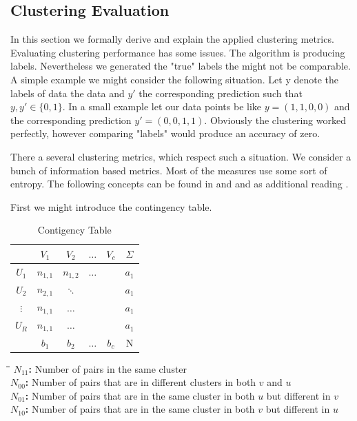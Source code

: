 \documentclass[12pt,a4paper,bibliography=totocnumbered,listof=totocnumbered]{scrartcl}
\begin{document}
\begin{appendix}
\subsection*{Clustering Evaluation}

In this section we formally derive and explain the applied clustering metrics. Evaluating clustering performance has some issues. The algorithm is producing labels. Nevertheless we generated the "true" labels the might not be comparable. A simple example we might consider the following situation. Let y denote the labels of data the data and $y'$ the corresponding prediction such that  $y,y' \in \{0,1\}$. In a small example let our data points be like $y=(1,1,0,0)$ and the corresponding prediction $y'=(0,0,1,1)$. Obviously the clustering worked perfectly, however comparing "labels" would produce an accuracy of zero. 

There a several clustering metrics, which respect such a situation. We consider a bunch of information based metrics. Most of the measures use some sort of entropy. The following concepts can be found in \cite{Rosenberg2007} and  \cite{Vinh2010} and as additional reading \cite{Hubert1985}. 

First we might introduce the contingency table. 

\setlength{\tabcolsep}{0.2cm}
\renewcommand{\arraystretch}{1}
\begin{table}[htb]
	\centering
	\begin{tabular}{c | c c c c| c}
		 & $V_1$ & $V_2$ & $\dots$ & $V_c$ & $\Sigma$ \\
		\hline
		$U_1$ & $n_{1,1}$ &$n_{1,2}$  &$\dots$ & & $a_1$ \\ 
		$U_2$ & $n_{2,1}$ & $\ddots$ & & & $a_1$ \\ 
		$\vdots$ & $n_{1,1}$ & $\dots$ & & & $a_1$ \\ 
		$U_R$ & $n_{1,1}$ & $\dots$ & & & $a_1$ \\ 
		\hline
		& $b_1$ & $b_2$ & $\dots$ & $b_c$ & N
	\end{tabular}
\caption{Contigency Table}
\end{table}


\begin{tabbing}
	\hspace*{1cm}\=\hspace*{1cm}\=\hspace*{3cm}\=\hspace*{2.7cm}\= \kill
	\onehalfspacing
	\textbf{$N_{11}$:} \>\> Number of pairs in the same cluster \\ 
	\textbf{$N_{00}$:} \>\> Number of pairs that are in different clusters in both $v$ and $u$ \\ 
	\textbf{$N_{01}$:} \>\> Number of pairs that are in the same cluster in both $u$ but different in $v$ \\ 
	\textbf{$N_{10}$:} \>\>  Number of pairs that are in the same cluster in both $v$ but different in $u$ \\ 
\end{tabbing}


\end{appendix}
\end{document}
